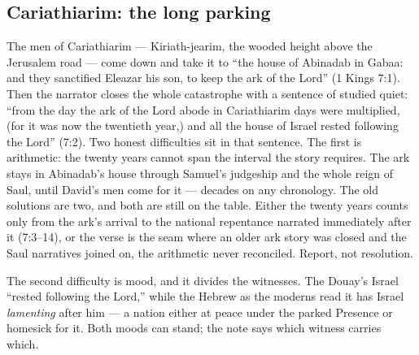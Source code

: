 \subsection{Cariathiarim: the long parking}

The men of Cariathiarim --- Kiriath-jearim, the wooded height above the
Jerusalem road --- come down and take it to ``the house of Abinadab in
Gabaa: and they sanctified Eleazar his son, to keep the ark of the
Lord'' (1 Kings 7:1). Then the narrator closes the
whole catastrophe with a sentence of studied quiet: ``from the day the ark
of the Lord abode in Cariathiarim days were multiplied, (for it was now the
twentieth year,) and all the house of Israel rested following the
Lord'' (7:2). Two honest difficulties sit in that sentence.
The first is arithmetic: the twenty years cannot span the interval the
story requires. The ark stays in Abinadab's house through Samuel's
judgeship and the whole reign of Saul, until David's men come for it ---
decades on any chronology. The old solutions are two, and both are still on
the table. Either the twenty years counts only from the ark's arrival to
the national repentance narrated immediately after it (7:3--14), or the
verse is the seam where an older ark story was closed and the Saul
narratives joined on, the arithmetic never reconciled. Report, not
resolution.

The second difficulty is mood, and it divides the witnesses. The Douay's
Israel ``rested following the Lord,'' while the Hebrew as the moderns read
it has Israel \emph{lamenting} after him --- a nation either at peace
under the parked Presence or homesick for it. Both moods can stand; the
note says which witness carries which.

